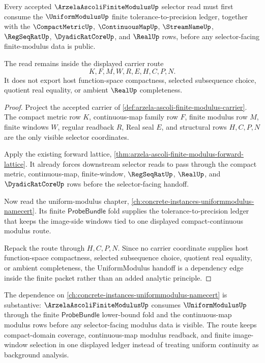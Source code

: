 \begin{theorem}
\label{thm:arzela-ascoli-finite-modulus-uniformmodulus-forward-route}
Every accepted $\ArzelaAscoliFiniteModulusUp$ selector read must first consume the $\UniformModulusUp$ finite tolerance-to-precision ledger, together with the $\CompactMetricUp$, $\ContinuousMapUp$, $\StreamNameUp$, $\RegSeqRatUp$, $\DyadicRatCoreUp$, and $\RealUp$ rows, before any selector-facing finite-modulus data is public.

The read remains inside the displayed carrier route
$$
K,F,M,W,R,E,H,C,P,N .
$$
It does not export host function-space compactness, selected subsequence choice, quotient real equality, or ambient $\RealUp$ completeness.
\end{theorem}
\begin{proof}
Project the accepted carrier of \autoref{def:arzela-ascoli-finite-modulus-carrier}. The compact metric row $K$, continuous-map family row $F$, finite modulus row $M$, finite windows $W$, regular readback $R$, Real seal $E$, and structural rows $H,C,P,N$ are the only visible selector coordinates.

Apply the existing forward lattice, \autoref{thm:arzela-ascoli-finite-modulus-forward-lattice}. It already forces downstream selector reads to pass through the compact metric, continuous-map, finite-window, $\RegSeqRatUp$, $\RealUp$, and $\DyadicRatCoreUp$ rows before the selector-facing handoff.

Now read the uniform-modulus chapter, \autoref{ch:concrete-instances-uniformmodulus-namecert}. Its finite $\mathsf{ProbeBundle}$ fold supplies the tolerance-to-precision ledger that keeps the image-side windows tied to one displayed compact-continuous modulus route.

Repack the route through $H,C,P,N$. Since no carrier coordinate supplies host function-space compactness, selected subsequence choice, quotient real equality, or ambient completeness, the UniformModulus handoff is a dependency edge inside the finite packet rather than an added analytic principle.
\end{proof}

The dependence on \autoref{ch:concrete-instances-uniformmodulus-namecert} is substantive: $\ArzelaAscoliFiniteModulusUp$ consumes $\UniformModulusUp$ through the finite $\mathsf{ProbeBundle}$ lower-bound fold and the continuous-map modulus rows before any selector-facing modulus data is visible. The route keeps compact-domain coverage, continuous-map modulus readback, and finite image-window selection in one displayed ledger instead of treating uniform continuity as background analysis.
